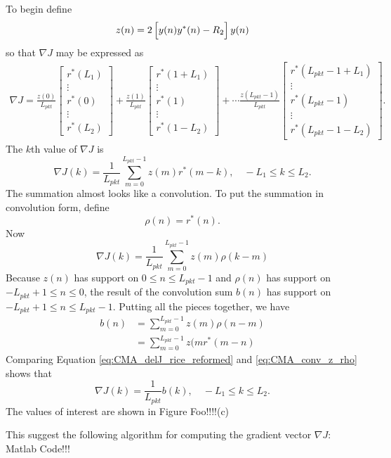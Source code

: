 To begin define
\begin{equation}
z(n) = 	2\left[ \vphantom{\displaystyle\sum}  y(n) y^\ast(n) - R_2 \right] y(n)
\end{equation} 
so that $\nabla J$ may be expressed as
\begin{multline}
\nabla J
	= 
	\frac{z(0)}{L_{pkt}}
		\begin{bmatrix} r^\ast(L_1) \\ \vdots \\ r^\ast(0) \\ \vdots \\ r^\ast(L_2) \end{bmatrix} +
	\frac{z(1)}{L_{pkt}}
		\begin{bmatrix} r^\ast(1+L_1) \\ \vdots \\ r^\ast(1) \\ \vdots \\ r^\ast(1-L_2) \end{bmatrix} + \cdots
	\frac{z(L_{pkt}-1)}{L_{pkt}}
		\begin{bmatrix} r^\ast(L_{pkt}-1+L_1) \\ \vdots \\ r^\ast(L_{pkt}-1) \\ \vdots \\ r^\ast(L_{pkt}-1-L_2) \end{bmatrix}
\label{eq:delJ_writeoutr}.
\end{multline}
The $k$th value of $\nabla J$ is
\begin{equation}
\nabla J(k) = \frac{1}{L_{pkt}} \sum^{L_{pkt}-1}_{m=0}  z(m) r^\ast(m-k), \quad -L_1 \leq k \leq L_2.
\end{equation}
The summation almost looks like a convolution.
To put the summation in convolution form, define
\begin{equation}
\rho(n) = r^\ast(n).
\end{equation}
Now
\begin{equation}
\nabla J(k) = \frac{1}{L_{pkt}} \sum^{L_{pkt}-1}_{m=0}  z(m) \rho(k-m)
\label{eq:CMA_delJ_rice_reformed}
\end{equation}
Because $z(n)$ has support on $0 \leq n \leq L_{pkt}-1$ and $\rho(n)$ has support on $-L_{pkt}+1 \leq n \leq 0$, 
the result of the convolution sum $b(n)$ has support on $-L_{pkt}+1 \leq n \leq L_{pkt}-1$.
Putting all the pieces together, we have
\begin{align}
b(n) &= \sum^{L_{pkt}-1}_{m=0} z(m) \rho(n-m) \nonumber \\
	 &= \sum^{L_{pkt}-1}_{m=0} z(mr^\ast(m-n)
	 \label{eq:CMA_conv_z_rho}
\end{align}
Comparing Equation \eqref{eq:CMA_delJ_rice_reformed} and \eqref{eq:CMA_conv_z_rho} shows that 
\begin{equation}
\nabla J(k) = \frac{1}{L_{pkt}} b(k), \quad -L_1 \leq k \leq L_2.
\label{eq:CMA_delJ_donzo}
\end{equation}
The values of interest are shown in Figure Foo!!!!(c)

This suggest the following algorithm for computing the gradient vector $\nabla J$:
Matlab Code!!!